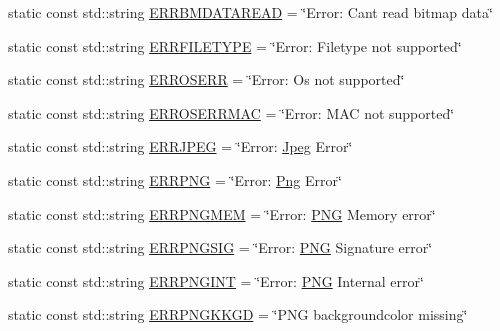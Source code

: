 \begin{DoxyCompactItemize}
\item 
static const std\+::string \mbox{\hyperlink{classErrorHandler_a0cc80205269faf8ab6a2898627d1d078}{E\+R\+R\+B\+M\+D\+A\+T\+A\+R\+E\+AD}} = \char`\"{}Error\+: Can\textquotesingle{}t read bitmap data\char`\"{}
\item 
static const std\+::string \mbox{\hyperlink{classErrorHandler_abc06f91cc00179b2993cb558770c4d80}{E\+R\+R\+F\+I\+L\+E\+T\+Y\+PE}} = \char`\"{}Error\+: Filetype not supported\char`\"{}
\item 
static const std\+::string \mbox{\hyperlink{classErrorHandler_addc0430f69f200c95ae36b23cd0d10a6}{E\+R\+R\+O\+S\+E\+RR}} = \char`\"{}Error\+: Os not supported\char`\"{}
\item 
static const std\+::string \mbox{\hyperlink{classErrorHandler_a05fc7c7e84ed87c3d91eeb5336a042e3}{E\+R\+R\+O\+S\+E\+R\+R\+M\+AC}} = \char`\"{}Error\+: M\+AC not supported\char`\"{}
\item 
static const std\+::string \mbox{\hyperlink{classErrorHandler_a1f2da6de4d5c03305cb97d742d4fd221}{E\+R\+R\+J\+P\+EG}} = \char`\"{}Error\+: \mbox{\hyperlink{classJpeg}{Jpeg}} Error\char`\"{}
\item 
static const std\+::string \mbox{\hyperlink{classErrorHandler_a8b7f4e33f0118e3a9a49308b8edbb5f3}{E\+R\+R\+P\+NG}} = \char`\"{}Error\+: \mbox{\hyperlink{classPng}{Png}} Error\char`\"{}
\item 
static const std\+::string \mbox{\hyperlink{classErrorHandler_adb02df3c256a08a19be5c1f5a0f3ca08}{E\+R\+R\+P\+N\+G\+M\+EM}} = \char`\"{}Error\+: \mbox{\hyperlink{constants_8h_afac9cfa577b92c66f46f7603f2f9fc14}{P\+NG}} Memory error\char`\"{}
\item 
static const std\+::string \mbox{\hyperlink{classErrorHandler_ad7f59edda1a1c28958eced1bc8bdeab7}{E\+R\+R\+P\+N\+G\+S\+IG}} = \char`\"{}Error\+: \mbox{\hyperlink{constants_8h_afac9cfa577b92c66f46f7603f2f9fc14}{P\+NG}} Signature error\char`\"{}
\item 
static const std\+::string \mbox{\hyperlink{classErrorHandler_a050e436624ffa1bf418075c4d20befe7}{E\+R\+R\+P\+N\+G\+I\+NT}} = \char`\"{}Error\+: \mbox{\hyperlink{constants_8h_afac9cfa577b92c66f46f7603f2f9fc14}{P\+NG}} Internal error\char`\"{}
\item 
static const std\+::string \mbox{\hyperlink{classErrorHandler_ad9b65ee3a71ddf4ef50a83035236a41b}{E\+R\+R\+P\+N\+G\+K\+K\+GD}} = \char`\"{}P\+NG backgroundcolor missing\char`\"{}
\end{DoxyCompactItemize}
